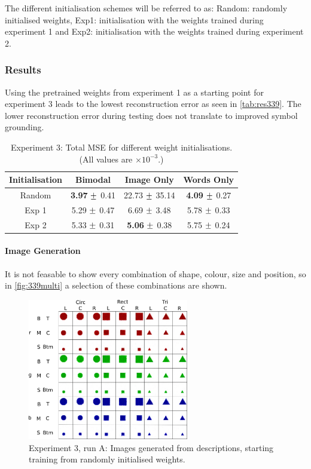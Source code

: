 The different initialisation schemes will be referred to as: Random: randomly initialised weights, Exp1: initialisation with the weights trained during experiment 1 and Exp2: initialisation with the weights trained during experiment 2.

\subsubsection{Results}
Using the pretrained weights from experiment 1 as a starting point for experiment 3 leads to the lowest reconstruction error as seen in \autoref{tab:res339}. The lower reconstruction error during testing does not translate to improved symbol grounding.


\begin{table}[h!]
\centering
	\begin{tabular}{|c|c|c|c|}
	\hline
	\textbf{Initialisation} & 	\textbf{Bimodal} & \textbf{Image Only} 	& 	\textbf{Words Only} \\ \hline
	Random	&	\textbf{3.97}	$\mypm$	0.41	&	22.73	$\mypm$	35.14	&	\textbf{4.09}	$\mypm$	0.27\\ \hline
	Exp 1 	&	5.29	$\mypm$	0.47	&	6.69	$\mypm$	3.48	&	5.78	$\mypm$	0.33	\\ \hline
	Exp 2 	&	5.33	$\mypm$	0.31	&	\textbf{5.06}	$\mypm$	0.38	&	5.75	$\mypm$	0.24	\\ \hline

	\end{tabular}
\caption{Experiment 3: Total MSE for different weight initialisations. (All values are $\times10^{-3}$.)}
\label{tab:res339}
\end{table}


\paragraph{Image Generation}
It is not feasable to show every combination of shape, colour, size and position, so in \autoref{fig:339multi} a selection of these combinations are shown.

\begin{figure}[h]
\centering
\includegraphics[width=0.625\textwidth]{Figs/shapes/multiword339.png}
\caption{Experiment 3, run A: Images generated from descriptions, starting training from randomly initialised weights.}
\label{fig:339multi}
\end{figure}

